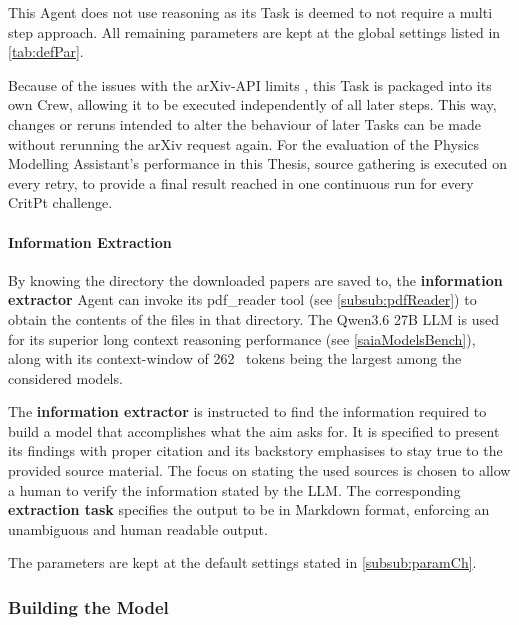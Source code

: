 \documentclass[
	fontsize = 11pt,
	paper = a4,
	draft = false,
	twoside = true,
	titlepage = false
]{scrartcl}
\numberwithin{equation}{subsection}
\begin{document}
	This \gls{Agent} does not use reasoning as its Task is deemed to not require a multi step approach. All remaining parameters are kept at the global settings listed in \autoref{tab:defPar}.
	
	Because of the issues with the arXiv-API limits \autocite{arxiv}, this Task is packaged into its own Crew, allowing it to be executed independently of all later steps. This way, changes or reruns intended to alter the behaviour of later Tasks can be made without rerunning the arXiv request again. For the evaluation of the Physics Modelling Assistant's performance in this Thesis, source gathering is executed on every retry, to provide a final result reached in one continuous run for every CritPt challenge.
	
	\paragraph{Information Extraction} \label{par:infoExtr} By knowing the directory the downloaded papers are saved to, the \textbf{information extractor} \gls{Agent} can invoke its pdf\_reader tool (see \autoref{subsub:pdfReader}) to obtain the contents of the files in that directory. The Qwen3.6 27B \gls{LLM} is used for its superior long context reasoning performance (see \autoref{saiaModelsBench}), along with its \gls{context-window} of \si{262 \kilo} \glspl{token} being the largest among the considered models.
	
	The \textbf{information extractor} is instructed to find the information required to build a model that accomplishes what the aim asks for. It is specified to present its findings with proper citation and its backstory emphasises to stay true to the provided source material. The focus on stating the used sources is chosen to allow a human to verify the information stated by the \gls{LLM}. The corresponding \textbf{extraction task} specifies the output to be in Markdown format, enforcing an unambiguous and human readable output.
	
	The parameters are kept at the default settings stated in \autoref{subsub:paramCh}.
	
	\subsubsection{Building the Model} \label{subsub:buildModel}
\end{document}
